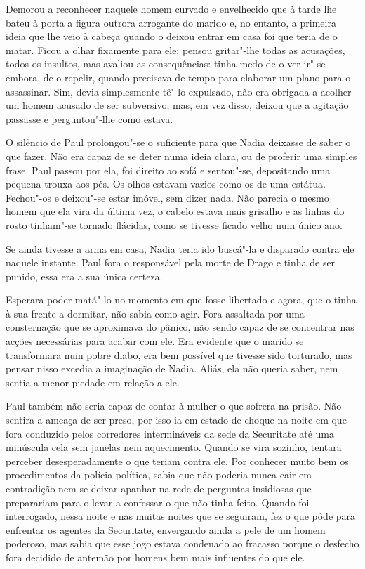 Demorou a reconhecer naquele homem curvado e envelhecido que à tarde
lhe bateu à porta a figura outrora arrogante do marido e, no entanto, a
primeira ideia que lhe veio à cabeça quando o deixou entrar em casa foi
que teria de o matar. Ficou a olhar fixamente para ele; pensou
gritar"-lhe todas as acusações, todos os insultos, mas avaliou as
consequências: tinha medo de o ver ir"-se embora, de o repelir, quando
precisava de tempo para elaborar um plano para o assassinar. Sim, devia
simplesmente tê"-lo expulsado, não era obrigada a acolher um homem
acusado de ser subversivo; mas, em vez disso, deixou que a agitação
passasse e perguntou"-lhe como estava.

O silêncio de Paul prolongou"-se o suficiente para que Nadia deixasse de
saber o que fazer. Não era capaz de se deter numa ideia clara, ou de
proferir uma simples frase. Paul passou por ela, foi direito ao sofá e
sentou"-se, depositando uma pequena trouxa aos pés. Os olhos estavam
vazios como os de uma estátua. Fechou"-os e deixou"-se estar imóvel, sem
dizer nada. Não parecia o mesmo homem que ela vira da última vez, o
cabelo estava mais grisalho e as linhas do rosto tinham"-se tornado
flácidas, como se tivesse ficado velho num único ano.

Se ainda tivesse a arma em casa, Nadia teria ido buscá"-la e disparado contra ele naquele instante. Paul fora o responsável
pela morte de Drago e tinha de ser punido, essa era a sua única certeza.

Esperara poder matá"-lo no momento em que fosse libertado e agora, que o
tinha à sua frente a dormitar, não sabia como agir. Fora assaltada por
uma consternação que se aproximava do pânico, não sendo capaz de se
concentrar nas acções necessárias para acabar com ele. Era evidente
que o marido se transformara num pobre diabo, era bem possível que
tivesse sido torturado, mas pensar nisso excedia a imaginação de Nadia.
Aliás, ela não queria saber, nem sentia a menor piedade em relação a
ele.

Paul também não seria capaz de contar à mulher o que sofrera na prisão.
Não sentira a ameaça de ser preso, por isso ia em estado de choque na
noite em que fora conduzido pelos corredores intermináveis da sede da
Securitate até uma minúscula cela sem janelas nem aquecimento. Quando se
vira sozinho, tentara perceber desesperadamente o que teriam contra ele. Por conhecer muito bem os procedimentos
da polícia política, sabia que não poderia nunca cair em contradição nem
se deixar apanhar na rede de perguntas insidiosas que preparariam para o
levar a confessar o que não tinha feito. Quando foi interrogado, nessa
noite e nas muitas noites que se seguiram, fez o que pôde para enfrentar
os agentes da Securitate, envergando ainda a pele de um homem poderoso,
mas sabia que esse jogo estava condenado ao fracasso porque o desfecho
fora decidido de antemão por homens bem mais influentes do que ele.

